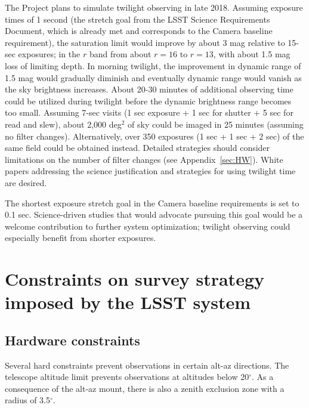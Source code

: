 \documentclass[DM,lsstdraft,toc,usenatbib]{lsstdoc}
\begin{document}
The Project plans to simulate twilight observing in late 2018. 
Assuming exposure times of 1 second (the stretch goal from the LSST Science Requirements Document, 
which is already met and corresponds to the Camera baseline requirement), the saturation limit would 
improve by about 3 mag relative to 15-sec exposures; in the $r$ band from about $r=16$ to $r=13$,
with about 1.5 mag loss of limiting depth. In morning twilight, the improvement in dynamic range of 1.5 mag would gradually
diminish and eventually dynamic range would vanish as the sky brightness increases. About 20-30 minutes
of additional observing time could be utilized during twilight before the dynamic brightness range becomes
too small. Assuming 7-sec visits (1 sec exposure + 1 sec for shutter + 5 sec for read and slew), about 
2,000 deg$^2$ of sky could be imaged in 25 minutes (assuming no filter changes). Alternatively, over 
350 exposures (1 sec + 1 sec + 2 sec) of the same field could be obtained instead.  Detailed strategies
should consider limitations on the number of filter changes (see Appendix~\ref{sec:HW}). 
White papers addressing the science justification and strategies for using twilight time are desired.

The shortest exposure stretch goal in the Camera baseline requirements is set to 0.1 sec. Science-driven
studies that would advocate pursuing this goal would be a welcome contribution to further system
optimization; twilight observing could especially benefit from shorter exposures. 
 

\section{Constraints on survey strategy imposed by the LSST system} 

\subsection{Hardware constraints \label{sec:HW}}

Several hard constraints prevent observations in certain alt-az directions. The telescope altitude limit
prevents observations at altitudes below 20$^\circ$.  As a consequence of the alt-az mount, there
is also a zenith exclusion zone with a radius of 3.5$^\circ$. 
\end{document}
